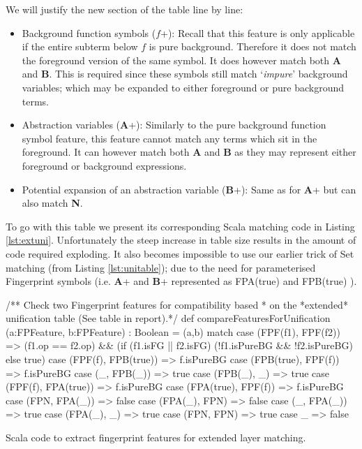 We will justify the new section of the table line by line:
\begin{itemize}
\item Background function symbols ($f$+): Recall that this feature is only applicable
if the entire subterm below $f$ is pure background. Therefore it does not
match the foreground version of the same symbol. It does however match both
\textbf{A} and \textbf{B}. This is required since these symbols still match `\emph{impure}' background variables;
which may be expanded to either foreground or pure background terms.
\item Abstraction variables (\textbf{A}+): Similarly to the pure background function symbol
feature, this feature cannot match any terms which sit in the foreground. It can however
match both \textbf{A} and \textbf{B} as they may represent either foreground or background
expressions.
\item Potential expansion of an abstraction variable (\textbf{B}+): Same as for \textbf{A}+
but can also match \textbf{N}.
\end{itemize}

To go with this table we present its corresponding Scala matching code in Listing \ref{lst:extuni}.
Unfortunately the steep increase in table size results in the amount of code required exploding.
It also becomes impossible to use our earlier trick of Set matching (from Listing \ref{lst:unitable}); due to the need for parameterised
Fingerprint symbols (i.e. \textbf{A}+ and \textbf{B}+ represented as FPA(true) and FPB(true) ).
\begin{listing}[H]
\begin{scalacode}
 /** Check two Fingerprint features for compatibility based
   * on the *extended* unification table (See table in report).*/
  def compareFeaturesForUnification
      (a:FPFeature, b:FPFeature) : Boolean = 
  (a,b) match {
    case (FPF(f1), FPF(f2))    => (f1.op == f2.op) && 
                                  (if (f1.isFG || f2.isFG) 
                                      (!f1.isPureBG && !f2.isPureBG)
                                   else true)
    case (FPF(f), FPB(true)) => f.isPureBG
    case (FPB(true), FPF(f)) => f.isPureBG
    case (_, FPB(_))         => true
    case (FPB(_), _)         => true
    case (FPF(f), FPA(true)) => f.isPureBG
    case (FPA(true), FPF(f)) => f.isPureBG
    case (FPN, FPA(_))       => false
    case (FPA(_), FPN)       => false
    case (_, FPA(_))         => true
    case (FPA(_), _)         => true
    case (FPN, FPN)          => true
    case _                   => false
  }
\end{scalacode}
\caption{Scala code to extract fingerprint features for extended layer matching.}
\label{lst:extuni}
\end{listing}

